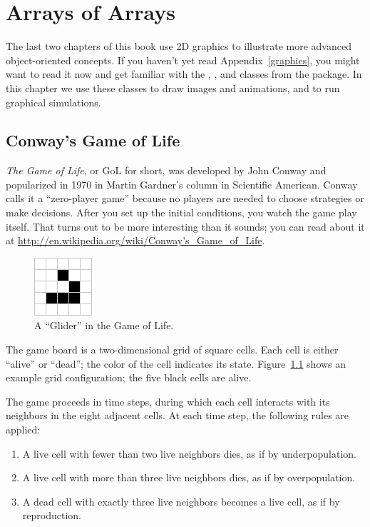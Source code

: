 \chapter{Arrays of Arrays}
\label{conway}

The last two chapters of this book use 2D graphics to illustrate more advanced object-oriented concepts.
If you haven't yet read Appendix~\ref{graphics}, you might want to read it now and get familiar with the , , and  classes from the  package.
In this chapter we use these classes to draw images and animations, and to run graphical simulations.


\section{Conway's Game of Life}

{\it The Game of Life}, or GoL for short, was developed by John Conway and popularized in 1970 in Martin Gardner's column in Scientific American.
Conway calls it a ``zero-player game'' because no players are needed to choose strategies or make decisions.
After you set up the initial conditions, you watch the game play itself.
That turns out to be more interesting than it sounds; you can read about it at \url{http://en.wikipedia.org/wiki/Conway's_Game_of_Life}.

\begin{figure}[!ht]
\begin{center}
\includegraphics{figs/glider.png}
\caption{A ``Glider'' in the Game of Life.}
\label{fig:glider}
\end{center}
\end{figure}

The game board is a two-dimensional grid of square cells.
Each cell is either ``alive'' or ``dead''; the color of the cell indicates its state.
Figure~\ref{fig:glider} shows an example grid configuration; the five black cells are alive.


The game proceeds in time steps, during which each cell interacts with its neighbors in the eight adjacent cells.
At each time step, the following rules are applied:

\begin{enumerate}
\small
\item A live cell with fewer than two live neighbors dies, as if by underpopulation.
\item A live cell with more than three live neighbors dies, as if by overpopulation.
\item A dead cell with exactly three live neighbors becomes a live cell, as if by reproduction.
\end{enumerate}

